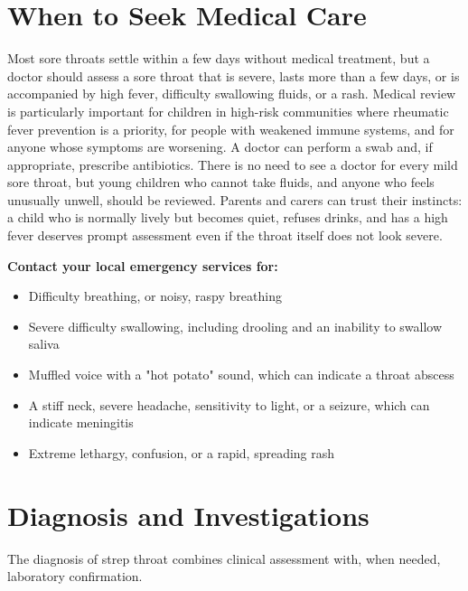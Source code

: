 \section*{When to Seek Medical Care}
Most sore throats settle within a few days without medical treatment, but a doctor should assess a sore throat that is severe, lasts more than a few days, or is accompanied by high fever, difficulty swallowing fluids, or a rash. Medical review is particularly important for children in high-risk communities where rheumatic fever prevention is a priority, for people with weakened immune systems, and for anyone whose symptoms are worsening. A doctor can perform a swab and, if appropriate, prescribe antibiotics. There is no need to see a doctor for every mild sore throat, but young children who cannot take fluids, and anyone who feels unusually unwell, should be reviewed. Parents and carers can trust their instincts: a child who is normally lively but becomes quiet, refuses drinks, and has a high fever deserves prompt assessment even if the throat itself does not look severe.

\textbf{Contact your local emergency services for:}
\begin{itemize}
    \item Difficulty breathing, or noisy, raspy breathing
    \item Severe difficulty swallowing, including drooling and an inability to swallow saliva
    \item Muffled voice with a "hot potato" sound, which can indicate a throat abscess
    \item A stiff neck, severe headache, sensitivity to light, or a seizure, which can indicate meningitis
    \item Extreme lethargy, confusion, or a rapid, spreading rash
\end{itemize}

\section*{Diagnosis and Investigations}
The diagnosis of strep throat combines clinical assessment with, when needed, laboratory confirmation.

